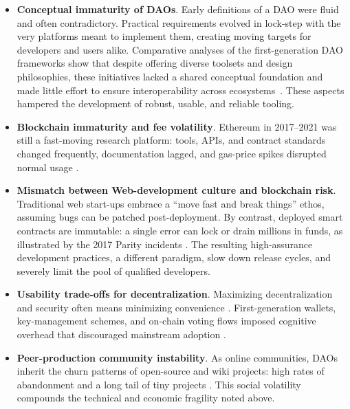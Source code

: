 \documentclass[10pt,lineno]{wlpeerj}
\begin{document}
\begin{itemize}
    \item \textbf{Conceptual immaturity of DAOs}.  Early definitions of a DAO were fluid and often contradictory. Practical requirements evolved in lock-step with the very platforms meant to implement them, creating moving targets for developers and users alike. Comparative analyses of the first-generation DAO frameworks show that despite offering diverse toolsets and design philosophies, these initiatives lacked a shared conceptual foundation and made little effort to ensure interoperability across ecosystems~\citep{Valiente2021}. These aspects hampered the development of robust, usable, and reliable tooling.
    
    \item \textbf{Blockchain immaturity and fee volatility}.  Ethereum in 2017–2021 was still a fast-moving research platform: tools, APIs, and contract standards changed frequently, documentation lagged, and gas-price spikes disrupted normal usage \citep{epps_ethglobal_2021,jagati_eth_scalability,FaqirRhazoui2021}.

    \item \textbf{Mismatch between Web-development culture and blockchain risk}. Traditional web start-ups embrace a “move fast and break things” ethos, assuming bugs can be patched post-deployment. By contrast, deployed smart contracts are immutable: a single error can lock or drain millions in funds, as illustrated by the 2017 Parity incidents \citep{suberg_parity_2017,hern_300m_2017}. The resulting high-assurance development practices, a different paradigm, slow down release cycles, and severely limit the pool of qualified developers.

    \item \textbf{Usability trade-offs for decentralization}.  Maximizing decentralization and security often means minimizing convenience \citep{swartz_squaring_2011}. First-generation wallets, key-management schemes, and on-chain voting flows imposed cognitive overhead that discouraged mainstream adoption \citep{saldivar_blockchain_2023}.

    \item \textbf{Peer-production community instability}.  As online communities, DAOs inherit the churn patterns of open-source and wiki projects: high rates of abandonment and a long tail of tiny projects \citep{Kaur_2022,tenorio-fornes_participation_2022}. This social volatility compounds the technical and economic fragility noted above.
    
\end{itemize}
\end{document}
